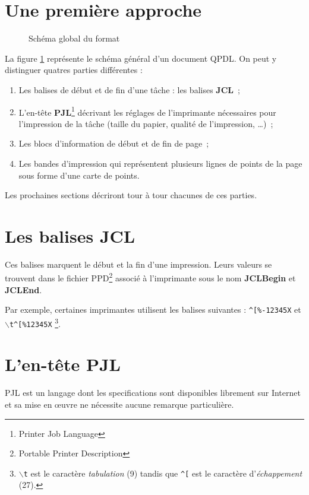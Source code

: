 \section{Une première approche}
\begin{figure}[!ht]

\caption{Schéma global du format}
\label{fig:schema_general}
\end{figure}

La figure \ref{fig:schema_general} représente le schéma général d'un
document QPDL. On peut y distinguer quatres parties différentes :
\begin{enumerate}
	\item Les balises de début et de fin d'une tâche : les balises 
		\textbf{JCL}~;
	\item L'en-tête \textbf{PJL}\footnote{Printer Job Language} décrivant
		les réglages de l'imprimante nécessaires pour l'impression
		de la tâche (taille du papier, qualité de l'impression,
		\ldots)~;
	\item Les blocs d'information de début et de fin de page~;
	\item Les bandes d'impression qui représentent plusieurs lignes de 
		points de la page sous forme d'une carte de points.
\end{enumerate}

Les prochaines sections décriront tour à tour chacunes de ces parties.




\section{Les balises JCL}
Ces balises marquent le début et la fin d'une impression. Leurs valeurs se
trouvent dans le fichier PPD\footnote{Portable Printer Description} associé
à l'imprimante sous le nom \textbf{JCLBegin} et \textbf{JCLEnd}.
\medskip

Par exemple, certaines imprimantes utilisent les balises suivantes : 
\texttt{\^{}[\%-12345X} et \texttt{$\backslash$t\^{}[\%12345X}
\footnote{\texttt{$\backslash$t} est le caractère \emph{tabulation} (9) tandis 
que \texttt{\^{}[} est le caractère d'\emph{échappement} (27).}.




\section{L'en-tête PJL}
PJL est un langage dont les specifications sont disponibles librement sur 
Internet et sa mise en \oe uvre ne nécessite aucune remarque particulière.

